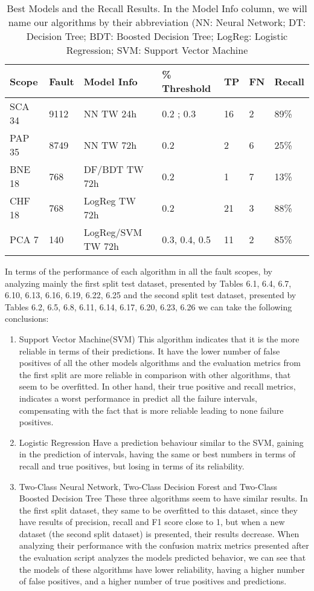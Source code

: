\begin{table}[!ht]
    \centering
    \begin{tabular}{|l|l|l|l|l|l|l|}
    \hline
        Scope & Fault & Model Info & \% Threshold & TP & FN & Recall \\ \hline
        SCA 34 & 9112 & NN TW 24h & 0.2 ; 0.3 & 16 & 2 & 89\% \\ \hline
        PAP 35 & 8749 & NN TW 72h & 0.2 & 2 & 6 & 25\% \\ \hline
        BNE 18 & 768 & DF/BDT TW 72h & 0.2 & 1 & 7 & 13\% \\ \hline
        CHF 18 & 768 & LogReg TW 72h & 0.2 & 21 & 3 & 88\% \\ \hline
        PCA 7 & 140 & LogReg/SVM TW 72h & 0.3, 0.4, 0.5 & 11 & 2 & 85\% \\ \hline
    \end{tabular}
    \caption{Best Models and the Recall Results. In the Model Info column, we will name our algorithms by their abbreviation (NN: Neural Network; DT: Decision Tree; BDT: Boosted Decision Tree; LogReg: Logistic Regression; SVM: Support Vector Machine}
\end{table}

In terms of the performance of each algorithm in all the fault scopes, by analyzing mainly the first split test dataset, presented by Tables 6.1, 6.4, 6.7, 6.10, 6.13, 6.16, 6.19, 6.22, 6.25 and the second split test dataset, presented by Tables 6.2, 6.5, 6.8, 6.11, 6.14, 6.17, 6.20, 6.23, 6.26 we can take the following conclusions:
\begin{enumerate}
    \item{Support Vector Machine(SVM)}
This algorithm indicates that it is the more reliable in terms of their predictions. It have the lower number of false positives of all the other models algorithms and the evaluation metrics from the first split are more reliable in comparison with other algorithms, that seem to be overfitted.
In other hand, their true positive and recall metrics, indicates a worst performance in predict all the failure intervals, compensating with the fact that is more reliable leading to none failure positives.
    \item{Logistic Regression}
Have a prediction behaviour similar to the SVM, gaining in the prediction of intervals, having the same or best numbers in terms of recall and true positives, but losing in terms of its reliability.
    \item{Two-Class Neural Network, Two-Class Decision Forest and Two-Class Boosted Decision Tree}
These three algorithms seem to have similar results. In the first split dataset, they same to be overfitted to this dataset, since they have results of precision, recall and F1 score close to 1, but when a new dataset (the second split dataset) is presented, their results decrease. When analyzing their performance with the confusion matrix metrics presented after the evaluation script analyzes the models predicted behavior, we can see that the models of these algorithms have lower reliability, having a higher number of false positives, and a higher number of true positives and predictions.
\end{enumerate}

